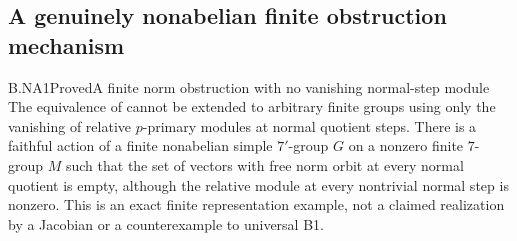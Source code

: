 \subsection{A genuinely nonabelian finite obstruction mechanism}

\begin{claim}{B.NA1}{Proved}{A finite norm obstruction with no vanishing normal-step module}
The equivalence of  cannot be extended to
arbitrary finite groups using only the vanishing of relative
$p$-primary modules at normal quotient steps. There is a
faithful action of a finite nonabelian simple $7'$-group $G$
on a nonzero finite $7$-group $M$ such that the set of vectors
with free norm orbit at every normal quotient is empty,
although the relative module at every nontrivial normal step
is nonzero. This is an exact finite representation example,
not a claimed realization by a Jacobian or a counterexample
to universal B1.
\end{claim}
